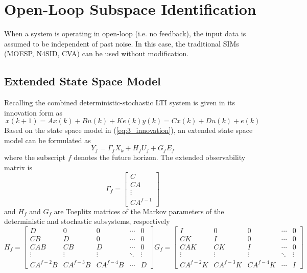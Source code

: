 \section{Open-Loop Subspace Identification}
When a system is operating in open-loop (i.e. no feedback), the input data is assumed to be independent of past noise. In this case, the traditional SIMs (MOESP, N4SID, CVA) can be used without modification. 

\subsection{Extended State Space Model}
Recalling the combined deterministic-stochastic LTI system is given in its innovation form as
\begin{subequations}\label{eq:3_innovation}
\begin{equation}x(k+1) = Ax(k) + Bu(k) + Ke(k)\end{equation}
\begin{equation}y(k) = Cx(k) + Du(k) + e(k)\end{equation}
\end{subequations}
Based on the state space model in (\ref{eq:3_innovation}), an extended state space model can be formulated as
\begin{equation}\label{eq:3_extended_state_space}
Y_f = \Gamma_f X_k + H_f U_f + G_f E_f
\end{equation}
where the subscript $f$ denotes the future horizon. The extended observability matrix is
\begin{equation}\label{eq:3_extended_observability}
\Gamma_f = \begin{bmatrix}C\\ CA\\ \vdots\\ CA^{f-1}\end{bmatrix}
\end{equation}
and $H_f$ and $G_f$ are Toeplitz matrices of the Markov parameters of the deterministic and stochastic subsystems, respectively
\begin{subequations}\label{eq:3_toeplitz}
\begin{equation}
H_f = \begin{bmatrix}
D & 0 & 0 & \cdots & 0\\
CB & D & 0 & \cdots & 0\\
CAB & CB & D & \cdots & 0\\
\vdots & \vdots  & \vdots & \ddots & \vdots\\
CA^{f-2}B & CA^{f-3}B & CA^{f-4}B & \cdots & D
\end{bmatrix}
\end{equation}
\begin{equation}
G_f = \begin{bmatrix}
I & 0 & 0 & \cdots & 0\\
CK & I & 0 & \cdots & 0\\
CAK & CK & I & \cdots & 0\\
\vdots & \vdots  & \vdots & \ddots & \vdots\\
CA^{f-2}K & CA^{f-3}K & CA^{f-4}K & \cdots & I
\end{bmatrix}
\end{equation}
\end{subequations}
